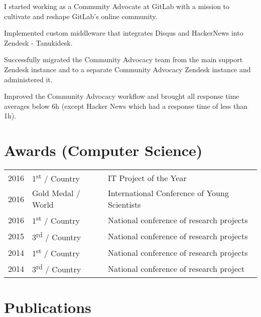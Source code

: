 \documentclass[]{matija-resume}
\begin{document}
\begin{minipage}[t]{0.66\textwidth}
\vspace{\topsep}
I started working as a Community Advocate at GitLab with a mission to cultivate and reshape GitLab's online community.
\vspace{\topsep}
\begin{tightemize}
\item Implemented custom middleware that integrates Disqus and HackerNews into Zendesk - Tanukidesk.
\item Successfully migrated the Community Advocacy team from the main support Zendesk instance and to a separate Community Advocacy Zendesk instance and administered it.
\item  Improved the Community Advocacy workflow and brought all response time averages below 6h (except Hacker News which had a response time of less than 1h).
\end{tightemize}
\sectionsep


\section{Awards (Computer Science)}
\begin{tabular}{rll}
2016 & 1\textsuperscript{st} / Country & IT Project of the Year\\
2016 & Gold Medal / World & International Conference of Young Scientists\\
2016 & 1\textsuperscript{st} / Country & National conference of research projects\\
2015 & 3\textsuperscript{rd} / Country & National conference of research projects\\
2014 & 1\textsuperscript{st} / Country & National conference of research projects\\
2014 & 3\textsuperscript{rd} / Country & National conference of research project
\end{tabular}
\sectionsep


\section{Publications}
\renewcommand\refname{\vskip -1.5em} %


\nocite{*}

\end{minipage}
\end{document}
